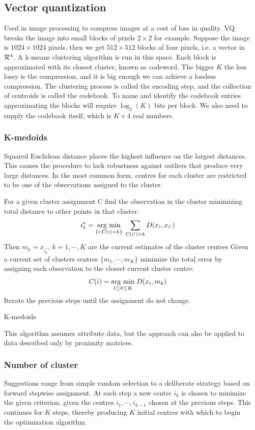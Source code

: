 \subsection{Vector quantization}
Used in image processing to compress images at a cost of loss in quality. VQ breaks the image into small blocks of pixels $2 \times 2$ for example. Suppose the image is $1024 \times 1024$ pixels, then we get $512\times 512$ blocks of four pixels, i.e. a vector in $\CMcal{R}^4$. A k-means clustering algorithm is run in this space.  Each block is approximated with its closest cluster, known as codeword. The bigger $K$ the less lossy is the compression, and it is big enough we can achieve a lossless compression. The clustering process is called the encoding step, and the collection of centroids is called the codebook. To name and identify the codebook entries approximating the blocks will require $\log_2(K)$ bits per block. We also need to supply the codebook itself, which is $K \times 4$ real numbers.

\subsubsection{K-medoids}
Squared Euclidean distance places the highest influence on the largest distances. This causes the procedure to lack robustness against outliers that produce very large distances.  In the most common form, centres for each cluster are restricted to be one of the observations assigned to the cluster.
\begin{algorithm}
For a given cluster assignment C find the observation in the cluster
minimizing total distance to other points in that cluster:
\begin{equation}
i_k^* = \underset{\{i:C(i) = k\}}{\operatorname{arg}\,\operatorname{min}}\; \sum_{C(i')=k}D(x_i, x_{i'})
\end{equation}
Then $m_k=x_{i_k^*}$, $k=1,\cdots, K$ are the current estimates of the cluster centres\;
Given a current set of clusters centres $\{m_1, \cdots, m_K\}$ minimize the total error by assigning each observation to the closest current cluster centre:
\begin{equation}
C(i) = \underset{1\le k\le K}{\operatorname{arg}\,\operatorname{min}}\;{D(x_i, m_k)}
\end{equation}\;
Iterate the previous steps until the assignment do not change.
\caption{K-medoids}
\end{algorithm}
This algorithm assumes attribute data, but the approach can also be applied to data described only by proximity matrices.

\subsubsection{Number of cluster}
Suggestions range from simple random selection to a deliberate strategy based on forward stepwise assignment. At each step a new centre $i_k$ is chosen to minimize the given criterion, given the centres $i_1, \cdots, i_{k-1}$ chosen at the previous steps. This continues for $K$ steps, thereby producing $K$ initial centres with which to begin the optimization algorithm.

